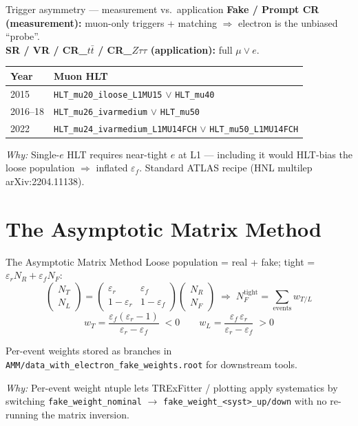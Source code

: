 \documentclass[10pt,aspectratio=169]{beamer}
\newcommand{\motiv}[1]{%
  \begin{tcolorbox}[colback=motivbg,colframe=motivbord,arc=1.5mm,boxrule=0.5pt,
                    left=1mm,right=1mm,top=0.5mm,bottom=0.5mm]
  \footnotesize\textit{Why:} #1
  \end{tcolorbox}}
\newcommand{\fname}[1]{\texttt{\tiny #1}}
\begin{document}
\begin{frame}{Trigger asymmetry — measurement vs.\ application}
  \scriptsize
  \textbf{Fake / Prompt CR (measurement):} muon-only triggers + matching
  $\Rightarrow$ electron is the unbiased ``probe''.\\
  \textbf{SR / VR / CR\_$t\bar t$ / CR\_$Z\tau\tau$ (application):} full $\mu\!\lor\!e$.

  \vspace{1mm}
  \begin{tabular}{ll}
    \toprule
    Year & Muon HLT \\
    \midrule
    2015     & \fname{HLT\_mu20\_iloose\_L1MU15} $\lor$ \fname{HLT\_mu40} \\
    2016--18 & \fname{HLT\_mu26\_ivarmedium} $\lor$ \fname{HLT\_mu50} \\
    2022     & \fname{HLT\_mu24\_ivarmedium\_L1MU14FCH} $\lor$ \fname{HLT\_mu50\_L1MU14FCH} \\
    \bottomrule
  \end{tabular}
  \motiv{Single-$e$ HLT requires near-tight $e$ at L1 — including it would
  HLT-bias the loose population $\Rightarrow$ inflated $\varepsilon_f$.
  Standard ATLAS recipe (HNL multilep arXiv:2204.11138).}
\end{frame}

\section{The Asymptotic Matrix Method}

\begin{frame}{The Asymptotic Matrix Method}
  \footnotesize
  Loose population = real + fake; tight = $\varepsilon_r N_R + \varepsilon_f N_F$:
  \[
    \begin{pmatrix}N_T\\N_L\end{pmatrix}
    =
    \begin{pmatrix}\varepsilon_r & \varepsilon_f\\
                   1{-}\varepsilon_r & 1{-}\varepsilon_f\end{pmatrix}
    \begin{pmatrix}N_R\\N_F\end{pmatrix}
    \;\Longrightarrow\;
    N_F^{\text{tight}}=\sum_{\text{events}} w_{T/L}
  \]
  \[
    w_T = \frac{\varepsilon_f(\varepsilon_r{-}1)}{\varepsilon_r{-}\varepsilon_f}\;<0
    \quad\quad
    w_L = \frac{\varepsilon_f\,\varepsilon_r}{\varepsilon_r{-}\varepsilon_f}\;>0
  \]

  Per-event weights stored as branches in
  \fname{AMM/data\_with\_electron\_fake\_weights.root} for downstream tools.

  \motiv{Per-event weight ntuple lets TRExFitter / plotting apply systematics
  by switching \fname{fake\_weight\_nominal} $\to$ \fname{fake\_weight\_<syst>\_up/down}
  with no re-running the matrix inversion.}
\end{frame}
\end{document}
